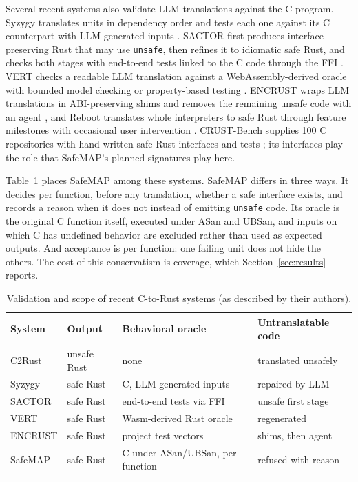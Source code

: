 \documentclass[conference]{IEEEtran}
\newcommand{\tool}{SafeMAP\xspace}
\begin{document}
Several recent systems also validate LLM translations against the C program.
Syzygy translates units in dependency order and tests each one against its C
counterpart with LLM-generated inputs \cite{shetty2024syzygy}. SACTOR first
produces interface-preserving Rust that may use \texttt{unsafe}, then refines
it to idiomatic safe Rust, and checks both stages with end-to-end tests linked
to the C code through the FFI \cite{zhou2025sactor}. VERT checks a readable
LLM translation against a WebAssembly-derived oracle with bounded model
checking or property-based testing \cite{yang2025vert}. ENCRUST wraps LLM
translations in ABI-preserving shims and removes the remaining unsafe code
with an agent \cite{sim2026encrust}, and Reboot translates whole interpreters
to safe Rust through feature milestones with occasional user intervention
\cite{wang2026reboot}. CRUST-Bench supplies 100 C repositories with
hand-written safe-Rust interfaces and tests \cite{khatry2025crustbench}; its
interfaces play the role that \tool's planned signatures play here.

Table~\ref{tab:related} places \tool among these systems. \tool differs in
three ways. It decides per function, before any translation, whether a safe
interface exists, and records a reason when it does not instead of emitting
\texttt{unsafe} code. Its oracle is the original C function itself, executed
under ASan and UBSan, and inputs on which C has undefined behavior are
excluded rather than used as expected outputs. And acceptance is per
function: one failing unit does not hide the others. The cost of this
conservatism is coverage, which Section~\ref{sec:results} reports.

\begin{table}[t]
\centering
\small
\caption{Validation and scope of recent C-to-Rust systems (as described by their authors).}
\label{tab:related}
\begin{tabular}{@{}llll@{}}
\toprule
System & Output & Behavioral oracle & Untranslatable code \\
\midrule
C2Rust \cite{c2rust} & unsafe Rust & none & translated unsafely \\
Syzygy \cite{shetty2024syzygy} & safe Rust & C, LLM-generated inputs & repaired by LLM \\
SACTOR \cite{zhou2025sactor} & safe Rust & end-to-end tests via FFI & unsafe first stage \\
VERT \cite{yang2025vert} & safe Rust & Wasm-derived Rust oracle & regenerated \\
ENCRUST \cite{sim2026encrust} & safe Rust & project test vectors & shims, then agent \\
\tool & safe Rust & C under ASan/UBSan, per function & refused with reason \\
\bottomrule
\end{tabular}
\end{table}
\end{document}
